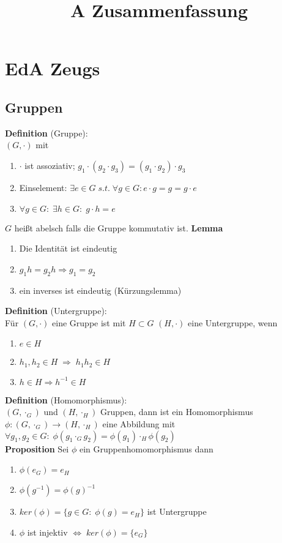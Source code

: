 \documentclass[a4paper, 12pt]{article}
\begin{document}
	\begin{titlepage} 
		\title{A Zusammenfassung}
		\clearpage\maketitle
		\thispagestyle{empty}
	\end{titlepage}
	\tableofcontents
	\section{EdA Zeugs}
	\subsection{Gruppen}
	\textbf{Definition} (Gruppe):\\ $(G,\cdot)$ mit \begin{enumerate}
		\item $\cdot$ ist assoziativ; $g_1 \cdot (g_2 \cdot g_3) = (g_1 \cdot g_2) \cdot g_3$
		\item Einselement: $\exists e \in G\; s.t.\; \forall g \in G: e\cdot g = g = g\cdot e$
		\item $\forall g \in G: \; \exists h \in G: \; g\cdot h = e$
	\end{enumerate}
$G$ heißt abelsch falls die Gruppe kommutativ ist.
\textbf{Lemma} \begin{enumerate}
	\item Die Identität ist eindeutig
	\item $g_1h = g_2h \Rightarrow g_1 = g_2$
	\item ein inverses ist eindeutig (Kürzungslemma)
\end{enumerate}
\textbf{Definition} (Untergruppe):\\
Für $(G,\cdot)$ eine Gruppe ist mit $H\subset G$ $(H,\cdot)$ eine Untergruppe, wenn \begin{enumerate}
	\item $e \in H$
	\item $h_1, h_2 \in H \; \Rightarrow \; h_1h_2 \in H$
	\item $h \in H \Rightarrow h^{-1} \in H$
\end{enumerate}
\textbf{Definition} (Homomorphismus):\\
$(G,\cdot_G)$ und $(H,\cdot_H)$ Gruppen, dann ist ein Homomorphismus $\phi: (G,\cdot_G) \to (H,\cdot_H)$ eine Abbildung mit $\forall g_1, g_2 \in G: \; \phi(g_1 \cdot_G g_2) = \phi(g_1) \cdot_H \phi(g_2)$\\
\textbf{Proposition} Sei $\phi$ ein Gruppenhomomorphismus dann \begin{enumerate}
	\item $\phi(e_G) = e_H$
	\item $\phi(g^{-1}) = \phi(g)^{-1}$
	\item $ker(\phi) = \{g \in G: \; \phi(g) = e_H\}$ ist Untergruppe
	\item $\phi$ ist injektiv $\Leftrightarrow \; ker(\phi) = \{e_G\}$
\end{enumerate}  
\end{document}
